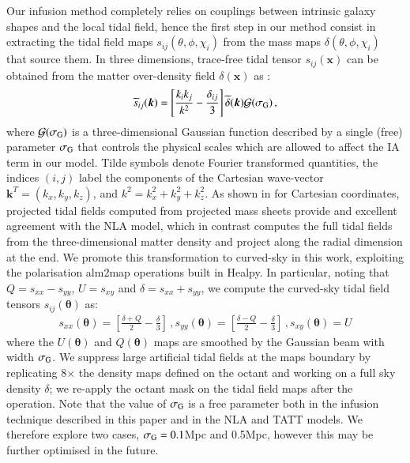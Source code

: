 \documentclass[useAMS,usenatbib]{mn2e}
\begin{document}
Our infusion method completely relies on couplings between intrinsic galaxy shapes and the local tidal field, hence the first step in our method consist in extracting the tidal field maps $s_{ij}(\theta,\phi,\chi_i)$ from the mass maps $\delta(\theta,\phi,\chi_i)$ that source them. In three dimensions, trace-free tidal tensor $s_{ij}(\boldsymbol x)$ can be obtained from the matter over-density field $\delta(\boldsymbol x)$ as   \citep{Catelan_IA_Tidal}:
\begin{eqnarray}
 \widetilde{s}_{ij} (\boldsymbol k)  = \left[\frac{k_i k_j}{k^2} - \frac{\delta_{ij}}{3}\right]  \widetilde {\delta}(\boldsymbol k) \mathcal{G}(\sigma_{\rm G}) \, ,
 \label{eq:sij}
\end{eqnarray}
where $\mathcal{G}(\sigma_{\rm G})$ is a three-dimensional Gaussian function described by a single (free) parameter $\sigma_{\rm G}$ that  controls the physical scales which are allowed to affect the IA term in our model. 
Tilde symbols  denote Fourier transformed quantities,  the indices $(i,j)$ label the components of the Cartesian wave-vector $\boldsymbol{k}^T = (k_x,k_y,k_z)$, and $k^2 = k_x^2 + k_y^2 + k_z^2$. 
As shown in \citet{HD+22} for Cartesian coordinates, projected tidal fields  computed from projected mass sheets provide and excellent agreement with the NLA model, which in contrast computes the full tidal fields from the three-dimensional matter density and project along the radial dimension at the end. We promote this transformation to curved-sky in this work, exploiting the  polarisation {\sc alm2map} operations built in {\sc Healpy}. In particular, noting that $Q=s_{xx}-s_{yy}$, $U=s_{xy}$ and $\delta=s_{xx}+s_{yy}$, we compute the curved-sky tidal field tensors ${s}_{ij}({\boldsymbol \theta})$ as:
 \begin{eqnarray}
s_{xx}({\boldsymbol \theta})  =  \left[\frac{ \delta + Q}{2}  - \frac{\delta}{3}\right] \, ,s_{yy}({\boldsymbol \theta})  =  \left[\frac{\delta - Q}{2}  - \frac{\delta}{3}\right] \, , s_{xy}({\boldsymbol \theta}) = U
 \label{eq:sij_2D_sph}
 \end{eqnarray}
where the $U({\boldsymbol \theta})$ and $Q({\boldsymbol \theta})$ maps are smoothed by the Gaussian beam with width $\sigma_{\rm G}$. We suppress large artificial tidal fields at the maps boundary by replicating 8$\times$ the density maps defined on the octant and working on a full sky density $\delta$; we re-apply the octant mask on the tidal field maps after the operation. Note that the value of $\sigma_{\rm G}$ is a free parameter both in the infusion technique described in this paper and in the NLA and TATT models. We therefore explore two cases, $\sigma_{\rm G}=0.1$Mpc and 0.5Mpc, however this may be further optimised in the future.
\end{document}
